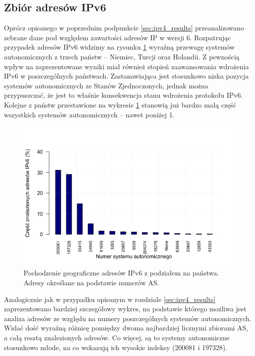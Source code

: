 \subsection{Zbiór adresów IPv6}
\noindent Oprócz opisanego w poprzednim podpunkcie \ref{sec:ipv4_results} przeanalizowano zebrane dane pod względem zawartości adresów IP
w wersji 6. Rozpatrując przypadek adresów IPv6 widzimy na rysunku \ref{fig:ipv6_as_countries} wyraźną przewagę systemów autonomicznych
z trzech państw -- Niemiec, Turcji oraz Holandii. Z pewnością wpływ na zaprezentowane wyniki miał również stopień zaawansowania
wdrożenia IPv6 w poszczególnych państwach. Zastanawiająca jest stosunkowo niska pozycja systemów autonomicznych ze Stanów Zjednoczonych,
jednak można przypuszczać, że jest to właśnie konsekwencja stanu wdrożenia protokołu IPv6. Kolejne z państw przestawione na
wykresie \ref{fig:ipv6_as_countries} stanowią już bardzo małą część wszystkich systemów autonomicznych -- nawet poniżej 1\textperthousand.
\begin{figure}[h]
	\centering
	\includegraphics[width=1.0\textwidth]{image/ipv6_countries_no_title}
	\caption{Pochodzenie geograficzne adresów IPv6 z podziałem na państwa. Adresy określane na podstawie numerów AS.}
	\label{fig:ipv6_as_countries}
\end{figure}

Analogicznie jak w przypadku opisanym w rozdziale \ref{sec:ipv4_results} zaprezentowano bardziej szczegółowy wykres, na podstawie
którego możliwa jest analiza adresów ze względu na numery poszczególnych systemów autonomicznych. Widać dość wyraźną różnicę pomiędzy
dwoma najbardziej licznymi zbiorami AS, a całą resztą znalezionych adresów. Co więcej, są to systemy autonomiczne stosunkowo młode,
na co wskazują ich wysokie indeksy (200081 i 197328).

